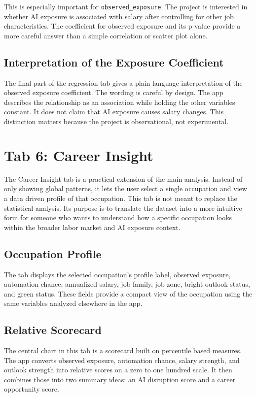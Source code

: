 \documentclass[11pt]{article}
\begin{document}
This is especially important for \texttt{observed\_exposure}. The project is interested in whether AI exposure is associated with salary after controlling for other job characteristics. The coefficient for observed exposure and its p value provide a more careful answer than a simple correlation or scatter plot alone.

\subsection*{Interpretation of the Exposure Coefficient}

The final part of the regression tab gives a plain language interpretation of the observed exposure coefficient. The wording is careful by design. The app describes the relationship as an association while holding the other variables constant. It does not claim that AI exposure causes salary changes. This distinction matters because the project is observational, not experimental.

\section*{Tab 6: Career Insight}

The Career Insight tab is a practical extension of the main analysis. Instead of only showing global patterns, it lets the user select a single occupation and view a data driven profile of that occupation. This tab is not meant to replace the statistical analysis. Its purpose is to translate the dataset into a more intuitive form for someone who wants to understand how a specific occupation looks within the broader labor market and AI exposure context.

\subsection*{Occupation Profile}

The tab displays the selected occupation's profile label, observed exposure, automation chance, annualized salary, job family, job zone, bright outlook status, and green status. These fields provide a compact view of the occupation using the same variables analyzed elsewhere in the app.

\subsection*{Relative Scorecard}

The central chart in this tab is a scorecard built on percentile based measures. The app converts observed exposure, automation chance, salary strength, and outlook strength into relative scores on a zero to one hundred scale. It then combines those into two summary ideas: an AI disruption score and a career opportunity score.
\end{document}
